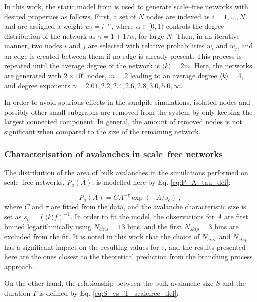 In this work, the static model from \cite{goh2003sandpile} is used to generate scale--free networks with desired properties as follows. First, a set of $N$ nodes are indexed as $i=1,..., N$ and are assigned a weight $w_i=i^{-\alpha}$, where $\alpha\in[0,1)$ controls the degree distribution of the network as $\gamma=1 + 1/\alpha$, for large $N$. Then, in an iterative manner, two nodes $i$ and $j$ are selected with relative probabilities $w_i$ and $w_j$, and an edge is created between them if no edge is already present. This process is repeated until the average degree of the network is $\langle k\rangle=2m$. Here, the networks are generated with $2\times10^5$ nodes, $m=2$ leading to an average degree $\langle k\rangle=4$, and degree exponents $\gamma=2.01, 2.2, 2.4, 2.6, 2.8, 3.0, 5.0, \infty$.

In order to avoid spurious effects in the sandpile simulations, isolated nodes and possibly other small subgraphs are removed from the system by only keeping the largest connected component. In general, the amount of removed nodes is not significant when compared to the size of the remaining network.

\subsubsection*{Characterisation of avalanches in scale--free networks}

The distribution of the area of bulk avalanches in the simulations performed on scale--free networks, $P_a(A)$, is modelled here by Eq. \ref{eq:P_A_tau_def}:

\begin{equation}
	P_a(A) = C A^{-\tau} \exp(-A / s_c) \ ,
	\label{eq:P_A_tau_def}
\end{equation}
where $C$ and $\tau$ are fitted from the data, and the avalanche characteristic size is set as $s_c=(\langle k\rangle f)^{-1}$. In order to fit the model, the observations for $A$ are first binned logarithmically using $N_{bins}=13$ bins, and the first $N_{skip}=3$ bins are excluded from the fit. It is noted in this work that the choice of $N_{bins}$ and $N_{skip}$ has a significant impact on the resulting values for $\tau$, and the results presented here are the ones closest to the theoretical prediction from the branching process approach. 

On the other hand, the relationship between the bulk avalanche size $S$ and the duration $T$ is defined by Eq. \ref{eq:S_vs_T_scalefree_def}:

